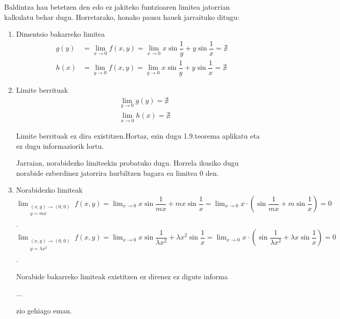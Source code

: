Baldintza hau betetzen den edo ez jakiteko funtzioaren limitea jatorrian kalkulatu behar dugu. Horretarako, honako pausu hauek jarraituko ditugu:
\begin{enumerate}
    \item Dimentsio bakarreko limitea
    \begin{eqnarray*}
        &g(y)&=\lim_{x \to 0}f(x,y)=\lim_{x \to 0} x\sin \dfrac{1}{y} +y \sin \dfrac{1}{x}= \nexists\\
        &h(x)&=\lim_{y \to 0}f(x,y)=\lim_{y \to 0} x\sin \dfrac{1}{y} +y \sin \dfrac{1}{x}= \nexists
    \end{eqnarray*}
    
    \item Limite berrituak
    \begin{eqnarray*}
        &&\lim_{y \to 0}g(y)=\nexists\\
        &&\lim_{x \to 0}h(x)=\nexists
    \end{eqnarray*}
    
    Limite berrituak ez dira existitzen.Hortaz, ezin dugu 1.9.teorema aplikatu eta ez dugu informaziorik lortu. 
    
    Jarraian, norabidezko limiteekin probatuko dugu. Horrela ikusiko dugu norabide ezberdinez jatorrira hurbiltzen bagara ea limitea 0 den.
    \item Norabidezko limiteak \newline
    \newline
    $\displaystyle{ \lim_{ \begin{array}{c} \scriptstyle (x,y) \rightarrow (0,0) \\ \scriptstyle y=mx \\ \end{array} } f(x,y)= \lim_{x \rightarrow 0} x\sin \dfrac{1}{mx} +mx \sin \dfrac{1}{x}=\lim_{x \rightarrow 0} x\cdot\left(\sin \dfrac{1}{mx} +m \sin \dfrac{1}{x}\right)=0} $.
    \newline
    $\displaystyle{ \lim_{ \begin{array}{c} \scriptstyle (x,y) \rightarrow (0,0) \\ \scriptstyle y=\lambda x^2 \\ \end{array} }f(x,y)= \lim_{x \rightarrow 0} x\sin \dfrac{1}{\lambda x^2} +\lambda x^2 \sin \dfrac{1}{x}=\lim_{x \rightarrow 0} x\cdot\left(\sin \dfrac{1}{\lambda x^2} +\lambda x \sin \dfrac{1}{x}\right)=0} $.
    
    Norabide bakarreko limiteak existitzen ez direnez ez digute informa\begin{flushleft}...\end{flushleft}zio gehiago eman.
    

\end{enumerate}
